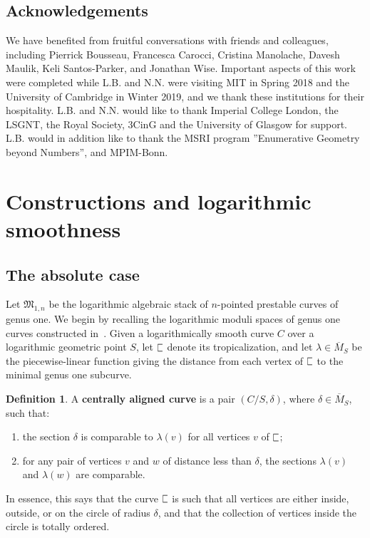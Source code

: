 \documentclass[11pt]{amsart}
\newcommand{\plC}{\scalebox{0.8}[1.3]{$\sqsubset$}}
\newcommand{\sqC}{\scalebox{0.8}[1.3]{$\sqsubset$}}
\theoremstyle{definition}
\theoremstyle{definition}
\newtheorem{definition}[thm]{Definition}
\begin{document}
\subsection*{Acknowledgements} We have benefited from fruitful conversations with friends and colleagues, including Pierrick Bousseau, Francesca Carocci, Cristina Manolache, Davesh Maulik, Keli Santos-Parker, and Jonathan Wise. Important aspects of this work were completed while L.B. and N.N. were visiting MIT in Spring 2018 and the University of Cambridge in Winter 2019, and we thank these institutions for their hospitality. L.B. and N.N. would like to thank Imperial College London, the LSGNT, the Royal Society, 3CinG and the University of Glasgow for support. L.B. would in addition like to thank the MSRI program ''Enumerative Geometry beyond Numbers'', and MPIM-Bonn.


\section{Constructions and logarithmic smoothness}\label{section construction}

\subsection{The absolute case} Let $\mathfrak M_{1,n}$ be the logarithmic algebraic stack of $n$-pointed prestable curves of genus one. We begin by recalling the logarithmic moduli spaces of genus one curves constructed in~\cite[\S 2 \& \S 4]{RSPW}. Given a logarithmically smooth curve $C$ over a logarithmic geometric point $S$, let $\plC$ denote its tropicalization, and let $\lambda \in \overline{M}_{S}$ be the piecewise-linear function giving the distance from each vertex of $\sqC$ to the minimal genus one subcurve.
\begin{definition}
A \textbf{centrally aligned curve} is a pair $(C/S,\delta)$, where $\delta\in\overline{M}_S$, such that:
\begin{enumerate}
    \item the section $\delta$ is comparable to $\lambda(v)$ for all vertices $v$ of $\plC$;
    \item for any pair of vertices $v$ and $w$ of distance less than $\delta$, the sections $\lambda(v)$ and $\lambda(w)$ are comparable.
\end{enumerate}
\end{definition}
In essence, this says that the curve $\sqC$ is such that all vertices are either inside, outside, or on the circle of radius $\delta$, and that the collection of vertices inside the circle is totally ordered.
\end{document}
